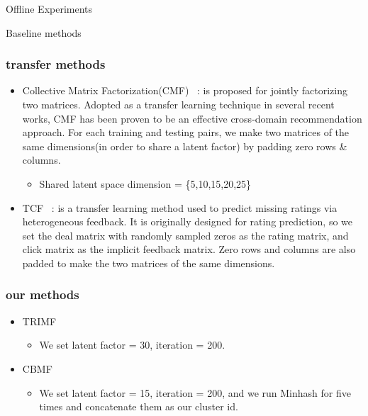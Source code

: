 \begin{section}{Offline Experiments}
\begin{subsection}{Baseline methods}
{\subsubsection{transfer methods}
\begin{itemize}
    \item Collective Matrix Factorization(CMF) ~\cite{/kdd/SinghG08}: is proposed for jointly factorizing two matrices. Adopted as a transfer
learning technique in several recent works, CMF has been proven to be an effective cross-domain recommendation approach. For each training and testing pairs, we make two matrices of the same dimensions(in order to share a latent factor) by padding zero rows \& columns.
      \begin{itemize}
      \item Shared latent space dimension = \{5,10,15,20,25\}
      \end{itemize}
    \item TCF ~\cite{/ijcai/PanLXY11}: is a transfer learning method used to predict missing ratings via heterogeneous feedback. It is originally designed for rating prediction, so we set the deal matrix with randomly sampled zeros as the rating matrix, and click matrix as the implicit feedback matrix. Zero rows and columns are also padded to make the two matrices of the same dimensions.
\end{itemize}
\subsubsection{our methods}
\begin{itemize}
\item TRIMF
  \begin{itemize}
  \item We set latent factor = 30, iteration = 200.
  \end{itemize}
  \item CBMF
  \begin{itemize}
  \item We set latent factor = 15, iteration = 200, and we run Minhash for five times and concatenate them as our cluster id.
  \end{itemize}
    \end{itemize}
  
}
\end{subsection}
\end{section}
